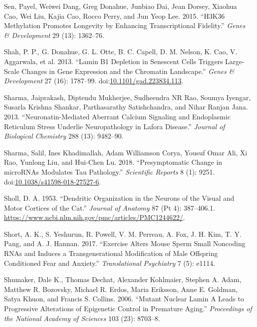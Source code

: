 \documentclass[onehalf,12pt]{beavtex}
\begin{document}
  \hypertarget{ref-SenH3K36methylationpromotes2015}{}
  Sen, Payel, Weiwei Dang, Greg Donahue, Junbiao Dai, Jean Dorsey, Xiaohua
  Cao, Wei Liu, Kajia Cao, Rocco Perry, and Jun Yeop Lee. 2015. ``H3K36
  Methylation Promotes Longevity by Enhancing Transcriptional Fidelity.''
  \emph{Genes \& Development} 29 (13): 1362--76.
  
  \hypertarget{ref-ShahLaminB1depletion2013}{}
  Shah, P. P., G. Donahue, G. L. Otte, B. C. Capell, D. M. Nelson, K. Cao,
  V. Aggarwala, et al. 2013. ``Lamin B1 Depletion in Senescent Cells
  Triggers Large-Scale Changes in Gene Expression and the Chromatin
  Landscape.'' \emph{Genes \& Development} 27 (16): 1787--99.
  doi:\href{https://doi.org/10.1101/gad.223834.113}{10.1101/gad.223834.113}.
  
  \hypertarget{ref-SharmaNeuronatinmediatedaberrantcalcium2013}{}
  Sharma, Jaiprakash, Diptendu Mukherjee, Sudheendra NR Rao, Soumya
  Iyengar, Susarla Krishna Shankar, Parthasarathy Satishchandra, and Nihar
  Ranjan Jana. 2013. ``Neuronatin-Mediated Aberrant Calcium Signaling and
  Endoplasmic Reticulum Stress Underlie Neuropathology in Lafora
  Disease.'' \emph{Journal of Biological Chemistry} 288 (13): 9482--90.
  
  \hypertarget{ref-SharmaPresymptomaticchangemicroRNAs2018}{}
  Sharma, Salil, Ines Khadimallah, Adam Williamson Corya, Yousuf Omar Ali,
  Xi Rao, Yunlong Liu, and Hui-Chen Lu. 2018. ``Presymptomatic Change in
  microRNAs Modulates Tau Pathology.'' \emph{Scientific Reports} 8 (1):
  9251.
  doi:\href{https://doi.org/10.1038/s41598-018-27527-6}{10.1038/s41598-018-27527-6}.
  
  \hypertarget{ref-ShollDendriticorganizationneurons1953}{}
  Sholl, D. A. 1953. ``Dendritic Organization in the Neurons of the Visual
  and Motor Cortices of the Cat.'' \emph{Journal of Anatomy} 87 (Pt 4):
  387--406.1. \url{https://www.ncbi.nlm.nih.gov/pmc/articles/PMC1244622/}.
  
  \hypertarget{ref-ShortExercisealtersmouse2017a}{}
  Short, A. K., S. Yeshurun, R. Powell, V. M. Perreau, A. Fox, J. H. Kim,
  T. Y. Pang, and A. J. Hannan. 2017. ``Exercise Alters Mouse Sperm Small
  Noncoding RNAs and Induces a Transgenerational Modification of Male
  Offspring Conditioned Fear and Anxiety.'' \emph{Translational
  Psychiatry} 7 (5): e1114.
  
  \hypertarget{ref-ShumakerMutantnuclearlamin2006}{}
  Shumaker, Dale K., Thomas Dechat, Alexander Kohlmaier, Stephen A. Adam,
  Matthew R. Bozovsky, Michael R. Erdos, Maria Eriksson, Anne E. Goldman,
  Satya Khuon, and Francis S. Collins. 2006. ``Mutant Nuclear Lamin A
  Leads to Progressive Alterations of Epigenetic Control in Premature
  Aging.'' \emph{Proceedings of the National Academy of Sciences} 103
  (23): 8703--8.
  
\end{document}
